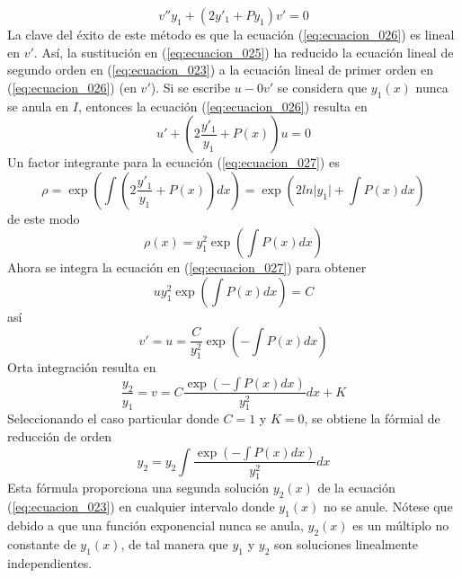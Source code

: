 \begin{equation}
v'' y_{1} + (2 y'_{1} + P y_{1}) v' = 0
\label{eq:ecuacion_026}
\end{equation}
La clave del éxito de este método es que la ecuación (\ref{eq:ecuacion_026}) es lineal en $v'$. Así, la sustitución en (\ref{eq:ecuacion_025}) ha reducido la ecuación lineal de segundo orden en (\ref{eq:ecuacion_023}) a la ecuación lineal de primer orden en (\ref{eq:ecuacion_026}) (en $v'$). Si se escribe $u -0 v'$ se considera que $y_{1}(x)$ nunca se anula en $I$, entonces la ecuación (\ref{eq:ecuacion_026}) resulta en
\begin{equation}
u' + \left( 2 \dfrac{y'_{1}}{y_{1}} + P(x) \right) u = 0
\label{eq:ecuacion_027}
\end{equation}
Un factor integrante para la ecuación (\ref{eq:ecuacion_027}) es
\[ \rho = \exp \left( \int	\left( 2 \dfrac{y'_{1}}{y_{1}} + P(x) \right) dx \right) = \exp \left( 2 ln \vert y_{1} \vert + \int P(x) dx \right)\]
de este modo
\[ \rho(x) = y_{1}^{2} \exp \left( \int P(x) dx \right)\]
Ahora se integra la ecuación en (\ref{eq:ecuacion_027}) para obtener
\[ u y_{1}^{2} \exp \left( \int P(x)  dx \right) = C \]
así
\[ v' = u = \dfrac{C}{y_{1}^{2}} \exp \left( - \int	P(x) dx \right) \]
Orta integración resulta en
\[ \dfrac{y_{2}}{y_{1}} = v = C \dfrac{\exp \left( - \int	P(x) dx \right)}{y_{1}^{2}} dx + K \]
Seleccionando el caso particular donde $C=1$ y $K=0$, se obtiene la fórmial de reducción de orden
\begin{equation}
y_{2} = y_{2} \int	\dfrac{\exp \left( - \int	P(x) dx \right)}{y_{1}^{2}} dx
\label{eq:ecuacion_028}
\end{equation}
Esta fórmula proporciona una segunda solución $y_{2}(x)$ de la ecuación (\ref{eq:ecuacion_023}) en cualquier intervalo donde $y_{1}(x)$ no se anule. Nótese que debido a que una función exponencial nunca se anula, $y_{2}(x)$ es un múltiplo no constante de $y_{1}(x)$, de tal manera que $y_{1}$ y $y_{2}$ son soluciones linealmente independientes.
